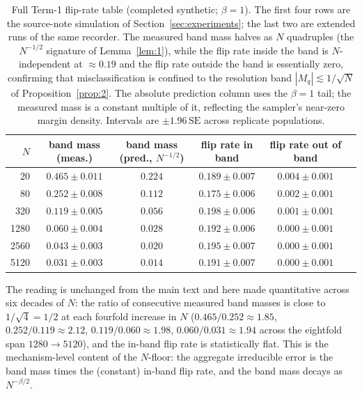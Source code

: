 \documentclass{article} %
\begin{document}
\begin{table}[t]
\centering
\small
\begin{tabular}{rccccc}
\toprule
$N$ & band mass (meas.) & band mass (pred., $N^{-1/2}$) & flip rate in band & flip rate out of band \\
\midrule
20   & $0.465 \pm 0.011$ & $0.224$ & $0.189 \pm 0.007$ & $0.004 \pm 0.001$ \\
80   & $0.252 \pm 0.008$ & $0.112$ & $0.175 \pm 0.006$ & $0.002 \pm 0.001$ \\
320  & $0.119 \pm 0.005$ & $0.056$ & $0.198 \pm 0.006$ & $0.001 \pm 0.001$ \\
1280 & $0.060 \pm 0.004$ & $0.028$ & $0.192 \pm 0.006$ & $0.000 \pm 0.001$ \\
\midrule
2560 & $0.043 \pm 0.003$ & $0.020$ & $0.195 \pm 0.007$ & $0.000 \pm 0.001$ \\
5120 & $0.031 \pm 0.003$ & $0.014$ & $0.191 \pm 0.007$ & $0.000 \pm 0.001$ \\
\bottomrule
\end{tabular}
\caption{Full Term-1 flip-rate table (completed synthetic;
$\beta=1$). The first four rows are the source-note simulation of
Section~\ref{sec:experiments}; the last two are extended runs of the same
recorder. The measured band mass halves as $N$ quadruples (the $N^{-1/2}$
signature of Lemma~\ref{lem:1}), while the flip rate inside the band is
$N$-independent at $\approx 0.19$ and the flip rate outside the band is
essentially zero, confirming that misclassification is confined to the
resolution band $|M_q|\lesssim 1/\sqrt N$ of Proposition~\ref{prop:2}. The
absolute prediction column uses the $\beta=1$ tail; the measured mass is a
constant multiple of it, reflecting the sampler's near-zero margin density.
Intervals are $\pm 1.96\,\mathrm{SE}$ across replicate populations.}
\label{tab:full-channel1}
\end{table}

The reading is unchanged from the main text and here made quantitative across
six decades of $N$: the ratio of consecutive measured band masses is close to
$1/\sqrt 4 = 1/2$ at each fourfold increase in $N$
($0.465/0.252\approx 1.85$, $0.252/0.119\approx 2.12$,
$0.119/0.060\approx 1.98$, $0.060/0.031\approx 1.94$ across the eightfold span
$1280\!\to\!5120$), and the in-band flip rate is statistically flat. This is the
mechanism-level content of the $N$-floor: the aggregate irreducible error is the
band mass times the (constant) in-band flip rate, and the band mass decays as
$N^{-\beta/2}$.
\end{document}
